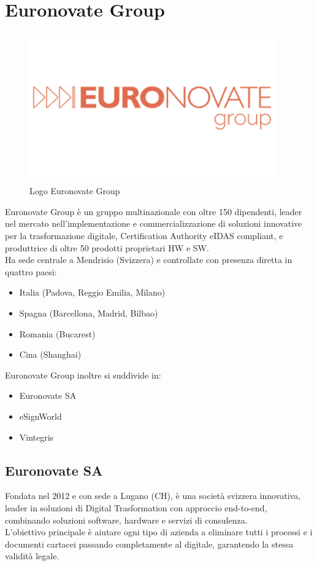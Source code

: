 \section{Euronovate Group}
\begin{figure}[!h] 
    \centering 
    \includegraphics[width=300pt]{images/euronovateGroupLogo.png} 
    \caption{Logo Euronovate Group}
    \label{fig:euronovateLogo}
\end{figure}
Euronovate Group è un gruppo multinazionale con oltre 150 dipendenti, leader nel mercato
nell'implementazione e commercializzazione di soluzioni innovative per la trasformazione digitale,
Certification Authority eIDAS compliant, e produttrice di oltre 50 prodotti proprietari HW e
SW.\\
Ha sede centrale a Mendrisio (Svizzera) e controllate con presenza diretta in quattro paesi:
\begin{itemize}
    \item Italia (Padova, Reggio Emilia, Milano)
    \item Spagna (Barcellona, Madrid, Bilbao)
    \item Romania (Bucarest)
    \item Cina (Shanghai)
\end{itemize}
Euronovate Group inoltre si suddivide in:
\begin{itemize}
    \item Euronovate SA
    \item eSignWorld
    \item Vintegris
\end{itemize}

\subsection{Euronovate SA}
Fondata nel 2012 e con sede a Lugano (CH), è una società svizzera innovativa, leader in soluzioni
di Digital Trasformation con approccio end-to-end, combinando soluzioni software, hardware
e servizi di consulenza.\\
L'obiettivo principale è aiutare ogni tipo di azienda a eliminare tutti i processi e i documenti
cartacei passando completamente al digitale, garantendo la stessa validità legale.
